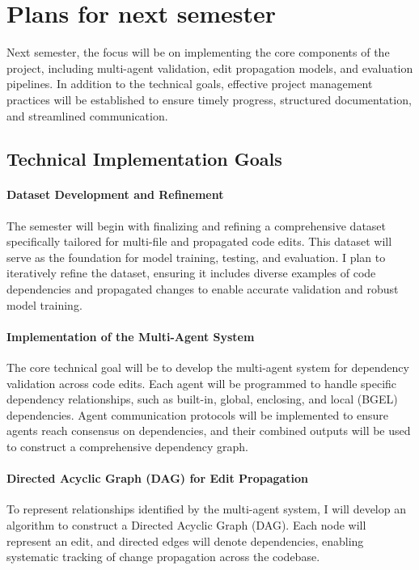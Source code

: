 \chapter{Plans for next semester}

Next semester, the focus will be on implementing the core components of the project, including multi-agent validation, edit propagation models, and evaluation pipelines. In addition to the technical goals, effective project management practices will be established to ensure timely progress, structured documentation, and streamlined communication.

\section{Technical Implementation Goals}

\subsubsection{Dataset Development and Refinement}

The semester will begin with finalizing and refining a comprehensive dataset specifically tailored for multi-file and propagated code edits. This dataset will serve as the foundation for model training, testing, and evaluation. I plan to iteratively refine the dataset, ensuring it includes diverse examples of code dependencies and propagated changes to enable accurate validation and robust model training.

\subsubsection{Implementation of the Multi-Agent System}

The core technical goal will be to develop the multi-agent system for dependency validation across code edits. Each agent will be programmed to handle specific dependency relationships, such as built-in, global, enclosing, and local (BGEL) dependencies. Agent communication protocols will be implemented to ensure agents reach consensus on dependencies, and their combined outputs will be used to construct a comprehensive dependency graph.

\subsubsection{Directed Acyclic Graph (DAG) for Edit Propagation}

To represent relationships identified by the multi-agent system, I will develop an algorithm to construct a Directed Acyclic Graph (DAG). Each node will represent an edit, and directed edges will denote dependencies, enabling systematic tracking of change propagation across the codebase.

